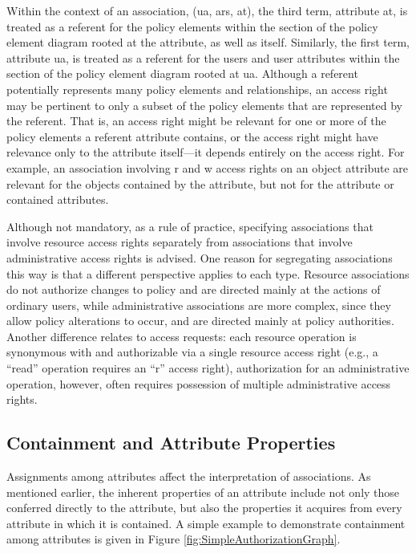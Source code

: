 \documentclass[12pt,a4paper,titlepage]{book}
\begin{document}
		Within the context of an association, (ua, ars, at), the third term, attribute at, is treated as a referent for the policy elements within the section of the policy element diagram rooted at the attribute, as well as itself. Similarly, the first term, attribute ua, is treated as a referent for the users and user attributes within the section of the policy element diagram rooted at ua. Although a referent potentially represents many policy elements and relationships, an access right may be pertinent to only a subset of the policy elements that are represented by the referent. That is, an access right might be relevant for one or more of the policy elements a referent attribute contains, or the access right might have relevance only to the attribute itself—it depends entirely on the access right. For example, an association involving r and w access rights on an object attribute are relevant for the objects contained by the attribute, but not for the attribute or contained attributes.
		
		Although not mandatory, as a rule of practice, specifying associations that involve resource
		access rights separately from associations that involve administrative access rights is advised. One reason for segregating associations this way is that a different perspective applies to each type. Resource associations do not authorize changes to policy and are directed mainly at the actions of ordinary users, while administrative associations are more complex, since they allow policy alterations to occur, and are directed mainly at policy authorities. Another difference relates to access requests: each resource operation is synonymous with and authorizable via a single resource access right (e.g., a “read” operation requires an “r” access right), authorization for an administrative operation, however, often requires possession of multiple administrative access rights.
	
	\subsection{Containment and Attribute Properties}
	
		Assignments among attributes affect the interpretation of associations. As mentioned earlier, the inherent properties of an attribute include not only those conferred directly to the attribute, but also the properties it acquires from every attribute in which it is contained. A simple example to demonstrate containment among attributes is given in Figure \ref{fig:SimpleAuthorizationGraph}.
		
\end{document}
